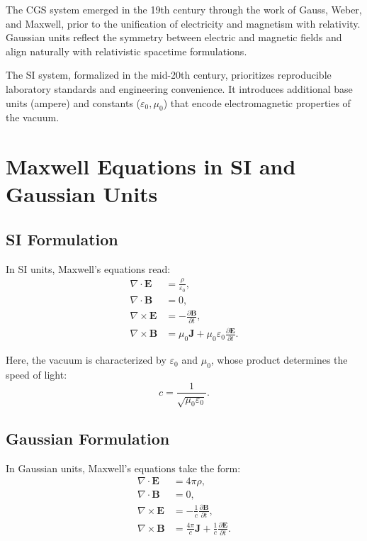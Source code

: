 \documentclass[aps,prd,preprint,superscriptaddress,nofootinbib]{revtex4-2}
\begin{document}
The CGS system emerged in the 19th century through the work of Gauss, Weber, and Maxwell, prior to the unification of electricity and magnetism with relativity. Gaussian units reflect the symmetry between electric and magnetic fields and align naturally with relativistic spacetime formulations.

The SI system, formalized in the mid-20th century, prioritizes reproducible laboratory standards and engineering convenience. It introduces additional base units (ampere) and constants ($\varepsilon_0, \mu_0$) that encode electromagnetic properties of the vacuum.

\section{Maxwell Equations in SI and Gaussian Units}

\subsection{SI Formulation}

In SI units, Maxwell’s equations read:
\begin{align}
\nabla \cdot \mathbf{E} &= \frac{\rho}{\varepsilon_0}, \\
\nabla \cdot \mathbf{B} &= 0, \\
\nabla \times \mathbf{E} &= -\frac{\partial \mathbf{B}}{\partial t}, \\
\nabla \times \mathbf{B} &= \mu_0 \mathbf{J} + \mu_0 \varepsilon_0 \frac{\partial \mathbf{E}}{\partial t}.
\end{align}

Here, the vacuum is characterized by $\varepsilon_0$ and $\mu_0$, whose product determines the speed of light:
\[
c = \frac{1}{\sqrt{\mu_0 \varepsilon_0}}.
\]

\subsection{Gaussian Formulation}

In Gaussian units, Maxwell’s equations take the form:
\begin{align}
\nabla \cdot \mathbf{E} &= 4\pi \rho, \\
\nabla \cdot \mathbf{B} &= 0, \\
\nabla \times \mathbf{E} &= -\frac{1}{c}\frac{\partial \mathbf{B}}{\partial t}, \\
\nabla \times \mathbf{B} &= \frac{4\pi}{c} \mathbf{J} + \frac{1}{c}\frac{\partial \mathbf{E}}{\partial t}.
\end{align}
\end{document}
